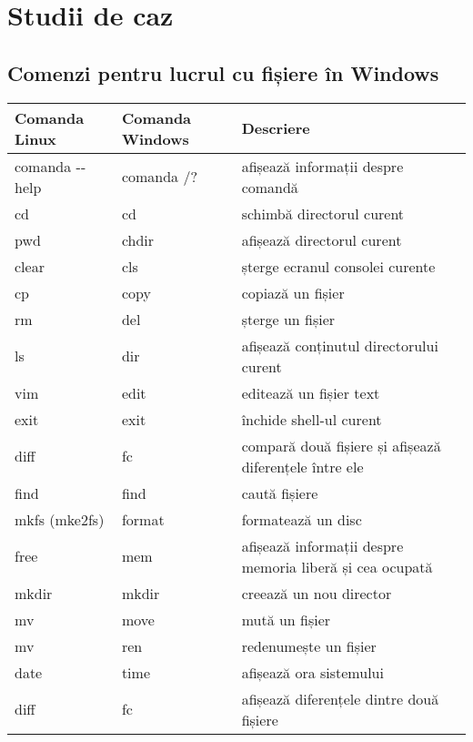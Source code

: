 
\section{Studii de caz}
\label{sec:file-system-case}

\subsection{Comenzi pentru lucrul cu fișiere în Windows}
\label{sec:file-system-case-windows}

\begin{table}[htb]
\begin{center}
	\begin{tabular}{ p{} p{} p{} }
	\toprule
		\textbf{Comanda Linux} & \textbf{Comanda Windows} & \textbf{Descriere} \\
	\midrule
		comanda -{}-help & comanda /? & afișează informații despre comandă \\
	\midrule
		cd & cd & schimbă directorul curent \\
	\midrule
		pwd & chdir & afișează directorul curent \\
	\midrule
		clear & cls & șterge ecranul consolei curente \\
	\midrule
		cp & copy & copiază un fișier \\
	\midrule
		rm & del & șterge un fișier \\
	\midrule
		ls & dir & afișează conținutul directorului curent \\
	\midrule
		vim & edit & editează un fișier text \\
	\midrule
		exit & exit & închide shell-ul curent \\
	\midrule
		diff & fc & compară două fișiere și afișează diferențele între ele \\
	\midrule
		find & find & caută fișiere \\
	\midrule
		mkfs (mke2fs) & format & formatează un disc \\
	\midrule
		free & mem & afișează informații despre memoria liberă și cea ocupată \\
	\midrule
		mkdir & mkdir & creează un nou director \\
	\midrule
		mv & move & mută un fișier \\
	\midrule
		mv & ren & redenumește un fișier \\
	\midrule
		date & time & afișează ora sistemului \\
	\midrule
		diff & fc & afișează diferențele dintre două fișiere \\
	\bottomrule
	\end{tabular}
	\label{table:file-system-case-study}
\end{center}
\end{table}
